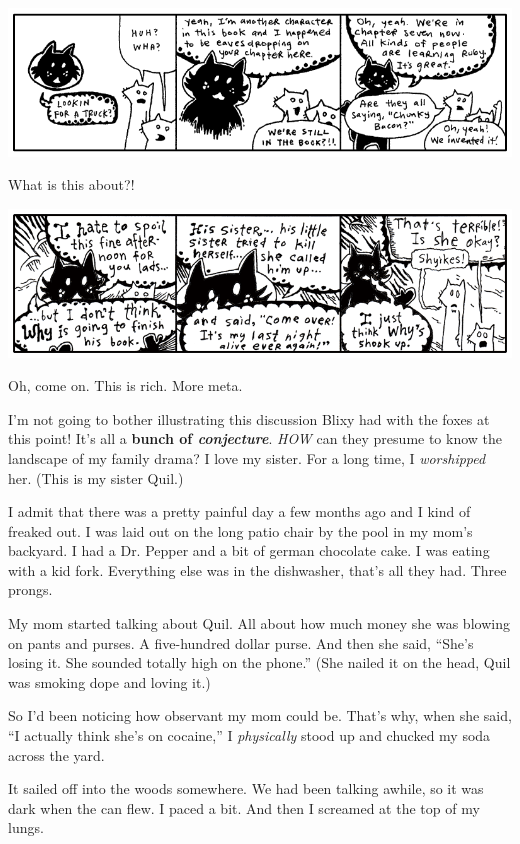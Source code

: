 \documentclass[10pt,twoside]{report}
\begin{document}
	\includegraphics[width=1.0\textwidth]{cache/68.png}

What is this about?!

	\includegraphics[width=1.0\textwidth]{cache/69.png}

Oh, come on.  This is rich.  More meta.

I'm not going to bother illustrating this discussion Blixy had with
the foxes at this point! It's all a {\bf bunch of {\em conjecture}}.
{\em HOW} can they presume to know the landscape of my family drama? I
love my sister.  For a long time, I {\em worshipped} her. (This is my
sister Quil.)

I admit that there was a pretty painful day a few months ago and I
kind of freaked out.  I was laid out on the long patio chair by the
pool in my mom's backyard.  I had a Dr. Pepper and a bit of german
chocolate cake.  I was eating with a kid fork.  Everything else was in
the dishwasher, that's all they had.  Three prongs.

My mom started talking about Quil.  All about how much money she was
blowing on pants and purses. A five-hundred dollar purse.  And then
she said, ``She's losing it. She sounded totally high on the phone.''
(She nailed it on the head, Quil was smoking dope and loving it.)

So I'd been noticing how observant my mom could be.  That's why, when
she said, ``I actually think she's on cocaine,'' I {\em physically}
stood up and chucked my soda across the yard.

It sailed off into the woods somewhere.  We had been talking awhile,
so it was dark when the can flew. I paced a bit.  And then I screamed
at the top of my lungs.
\end{document}
